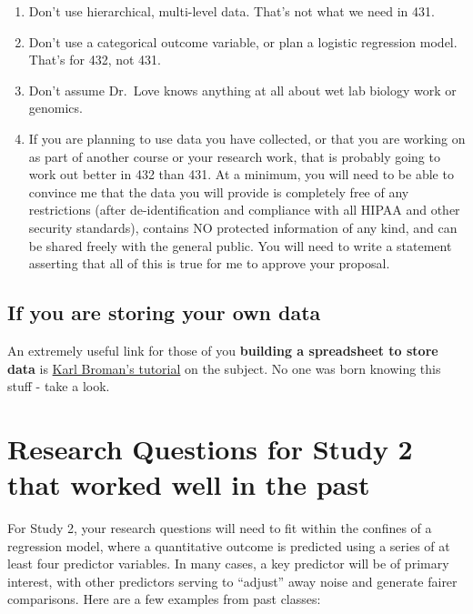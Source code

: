 \documentclass[]{book}
\providecommand{\tightlist}{%
  \setlength{\itemsep}{0pt}\setlength{\parskip}{0pt}}
\theoremstyle{definition}
\theoremstyle{definition}
\theoremstyle{definition}
\theoremstyle{remark}
\begin{document}
\begin{enumerate}
\def\labelenumi{\arabic{enumi}.}
\tightlist
\item
  Don't use hierarchical, multi-level data. That's not what we need in
  431.
\item
  Don't use a categorical outcome variable, or plan a logistic
  regression model. That's for 432, not 431.
\item
  Don't assume Dr.~Love knows anything at all about wet lab biology work
  or genomics.
\item
  If you are planning to use data you have collected, or that you are
  working on as part of another course or your research work, that is
  probably going to work out better in 432 than 431. At a minimum, you
  will need to be able to convince me that the data you will provide is
  completely free of any restrictions (after de-identification and
  compliance with all HIPAA and other security standards), contains NO
  protected information of any kind, and can be shared freely with the
  general public. You will need to write a statement asserting that all
  of this is true for me to approve your proposal.
\end{enumerate}

\hypertarget{if-you-are-storing-your-own-data}{%
\subsection{If you are storing your own
data}\label{if-you-are-storing-your-own-data}}

An extremely useful link for those of you \textbf{building a spreadsheet
to store data} is \href{http://kbroman.org/dataorg/}{Karl Broman's
tutorial} on the subject. No one was born knowing this stuff - take a
look.

\hypertarget{research-questions-for-study-2-that-worked-well-in-the-past}{%
\section{Research Questions for Study 2 that worked well in the
past}\label{research-questions-for-study-2-that-worked-well-in-the-past}}

For Study 2, your research questions will need to fit within the
confines of a regression model, where a quantitative outcome is
predicted using a series of at least four predictor variables. In many
cases, a key predictor will be of primary interest, with other
predictors serving to ``adjust'' away noise and generate fairer
comparisons. Here are a few examples from past classes:
\end{document}
